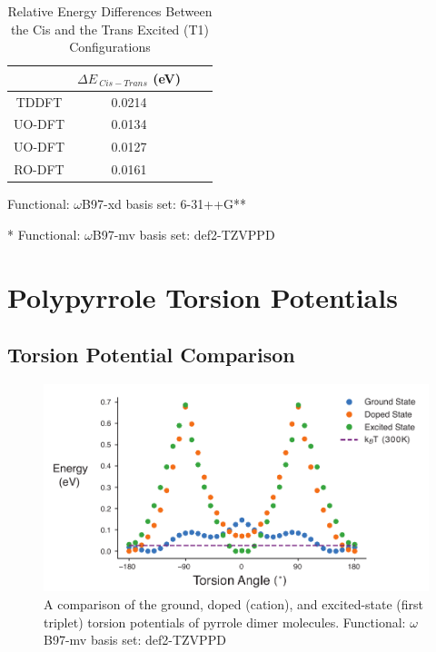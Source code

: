 \begin{table}[hbt!]\centering
\captionsetup{justification=centering}
\captionsetup{width=.6\textwidth}
\captionsetup{skip=2pt}
\caption{Relative Energy Differences Between the Cis and the Trans Excited (T1) Configurations}
\label{tab:ex_ct_gap}
\renewcommand{\arraystretch}{1.5}
\begin{threeparttable}
\begin{tabular}{cccc}\toprule
\multicolumn{1}{c}{\multirow{1}{3.5cm}{\centering }} &
\multicolumn{1}{c}{\multirow{1}{3.5cm}{\centering $\Delta E_{\ Cis - Trans}$ (eV)}} \\ \midrule
    TDDFT\tnote{\textdagger} & 0.0214\\
    UO-DFT\tnote{\textdagger} & 0.0134\\
    UO-DFT\tnote{*} & 0.0127\\
    RO-DFT\tnote{*} & 0.0161\\ \bottomrule
\end{tabular}
\begin{tablenotes}
\item[\textdagger] \footnotesize Functional: $\omega$B97-xd basis set: 6-31++G**
\item[*] \footnotesize Functional: $\omega$B97-mv basis set: def2-TZVPPD
\end{tablenotes}
\end{threeparttable}
\end{table}

\section{Polypyrrole Torsion Potentials}
\label{sec:ppy}
\subsection{Torsion Potential Comparison}

\begin{figure}[hbt!]
    \centering
    \includegraphics{figures/append_tor_model/ppy_torsion_compare.pdf}
    \caption[Comparison of the Ground, Doped, and Excited-state Torsion Potentials of PPy]{A comparison of the ground, doped (cation), and excited-state (first triplet) torsion potentials of pyrrole dimer molecules. Functional: $\omega$B97-mv basis set: def2-TZVPPD}
    \label{fig:ppy_tor}
\end{figure}

